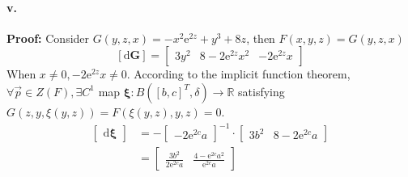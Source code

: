 \documentclass[11pt, a4paper]{article}
\begin{document}
\paragraph{v.}
\textbf{Proof:}
Consider $G(y, z, x) = -x^2\mathrm{e}^{2z} + y^3 + 8z$, then $F(x, y, z) = G(y, z, x)$
$$[\mathrm{d}\bm{G}] = 
\begin{bmatrix}
    3y^2 & 8 - 2\mathrm{e}^{2z}x^2 & -2\mathrm{e}^{2z}x
\end{bmatrix}$$
When $x \neq 0, -2\mathrm{e}^{2z}x \neq 0$. According to the implicit function theorem, $\forall \vec{p} \in Z(F), \exists C^1$ map $\bm{\xi}: B([b, c]^T, \delta) \to \mathbb{R}$ satisfying $G(z, y, \xi(y, z)) = F(\xi(y, z), y, z) = 0$.
$$\begin{aligned}
    \begin{bmatrix}
        \mathrm{d}\bm{\xi}
    \end{bmatrix} &= -
    \begin{bmatrix}
        -2\mathrm{e}^{2c}a
    \end{bmatrix}^{-1} \cdot 
    \begin{bmatrix}
        3b^2 & 8 - 2\mathrm{e}^{2c}a
    \end{bmatrix} \\
    &=
    \begin{bmatrix}
        \frac{3b^2}{2\mathrm{e}^{2c}a} & \frac{4 - \mathrm{e}^{2c}a^2}{\mathrm{e}^{2c}a}
    \end{bmatrix}
\end{aligned}$$
\end{document}
